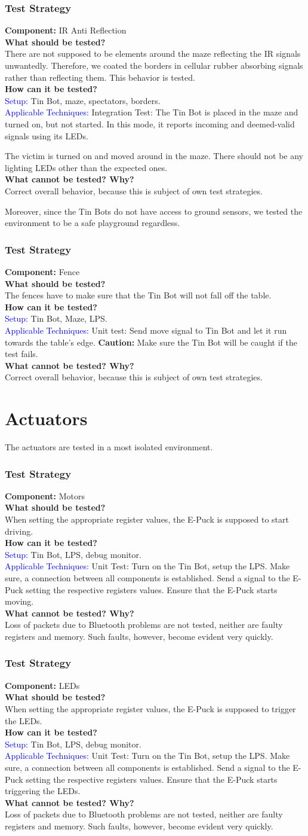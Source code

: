 \documentclass[a4paper,parskip,headheight=38pt]{scrartcl} %
\newcommand{\teststrat}[5]{
    \subsubsection{Test Strategy}
	\textbf{Component:} #1 \\
	\noindent\textbf{What should be tested?} \\
    \noindent #2 \\
	\noindent\textbf{How can it be tested?} \\
    \noindent\textcolor{blue}{Setup:} #3 \\
    \noindent\textcolor{blue}{Applicable Techniques:} #4 \\
	\noindent\textbf{What cannot be tested? Why?} \\
    \noindent #5
}
\begin{document}
\teststrat{IR Anti Reflection}{
    There are not supposed to be elements around the maze reflecting the IR
    signals unwantedly. Therefore, we coated the borders in cellular rubber
    absorbing signals rather than reflecting them. This behavior is tested.
}{
    Tin Bot, maze, spectators, borders.
}{
    Integration Test: 
    The Tin Bot is placed in the maze and turned on, but not
    started. In this mode, it reports incoming and deemed-valid signals using
    its LEDs. 

    The victim is turned on and moved around in the maze. There should not be
    any lighting LEDs other than the expected ones.
}{
    Correct overall behavior, because this is subject of own test strategies.
}

Moreover, since the Tin Bots do not have access to ground sensors, we tested the
environment to be a safe playground regardless.

\teststrat{Fence}{
    The fences have to make sure that the Tin Bot will not fall off the table.
}{
    Tin Bot, Maze, LPS.
}{
    Unit test: Send move signal to Tin Bot and let it run towards the table's
    edge. \textbf{Caution:} Make sure the Tin Bot will be caught if the test
    fails.
}{
    Correct overall behavior, because this is subject of own test strategies.
}

\section{Actuators}

The actuators are tested in a most isolated environment.

\teststrat{Motors}{
    When setting the appropriate register values, the E-Puck is supposed to
    start driving.
}{
    Tin Bot, LPS, debug monitor.
}{
    Unit Test: Turn on the Tin Bot, setup the LPS. Make sure, a connection
    between all components is established. Send a signal to the E-Puck setting
    the respective registers values. Ensure that the E-Puck starts moving.
}{
    Loss of packets due to Bluetooth problems are not tested, neither are faulty
    registers and memory. Such faults, however, become evident very quickly.
}

\teststrat{LEDs}{
    When setting the appropriate register values, the E-Puck is supposed to
    trigger the LEDs.
}{
    Tin Bot, LPS, debug monitor.
}{
    Unit Test: Turn on the Tin Bot, setup the LPS. Make sure, a connection
    between all components is established. Send a signal to the E-Puck setting
    the respective registers values. Ensure that the E-Puck starts triggering
    the LEDs.
}{
    Loss of packets due to Bluetooth problems are not tested, neither are faulty
    registers and memory. Such faults, however, become evident very quickly.
}
\end{document}
